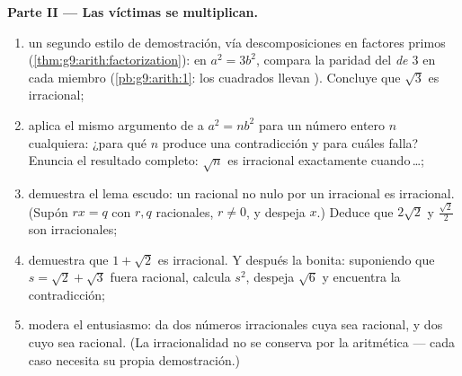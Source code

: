 \begin{problem}
\medskip
\noindent\textbf{Parte II --- Las víctimas se multiplican.}
\begin{enumerate}[resume]
  \item un segundo estilo de demostración, vía descomposiciones en factores primos
        (\cref{thm:g9:arith:factorization}): en $a^2 = 3b^2$,
        compara la paridad del \emph{ de $3$} en cada
        miembro (\cref{pb:g9:arith:1}: los cuadrados llevan 
        ). Concluye que $\sqrt3$ es irracional;
  \item aplica el mismo argumento de  a $a^2 = n b^2$ para un
        número entero $n$ cualquiera: ¿para qué $n$ produce
        una contradicción y para cuáles falla? Enuncia el
        resultado completo: $\sqrt n$ es irracional exactamente
        cuando\,\dots;
  \item demuestra el lema escudo: un racional no nulo por un
        irracional es irracional. (Supón $r x = q$ con $r, q$
        racionales, $r \neq 0$, y despeja $x$.) Deduce que
        $2\sqrt2$ y $\frac{\sqrt2}{2}$ son irracionales;
  \item demuestra que $1 + \sqrt2$ es irracional. Y después la bonita:
        suponiendo que $s = \sqrt2 + \sqrt3$ fuera racional,
        calcula $s^2$, despeja $\sqrt6$ y encuentra la
        contradicción;
  \item modera el entusiasmo: da dos números irracionales cuya
        \emph{} sea racional, y dos cuyo \emph{} sea
        racional. (La irracionalidad no se conserva por la aritmética
        --- cada caso necesita su propia demostración.)
\end{enumerate}


\end{problem}
